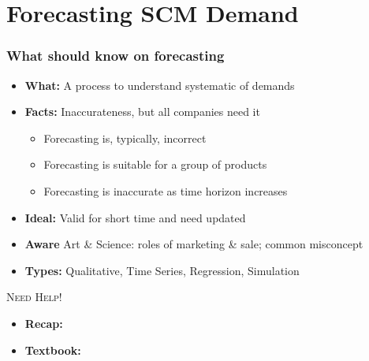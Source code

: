 \documentclass[10pt,handout,notes=show]{beamer}
\begin{document}
\section[Forecasting]{Forecasting SCM Demand}
\begin{frame}
  \frametitle{What should know on forecasting }

  \begin{itemize}
    \item \textbf{What:} A process to understand \alert{systematic of demands}
    \item \textbf{Facts:} Inaccurateness, but all companies need it
    \begin{itemize}
      \item Forecasting is, typically, \alert{incorrect}
      \item Forecasting is suitable for a \alert{group of products}
      \item Forecasting is \alert{inaccurate as time horizon increases} \NextHalfLine
    \end{itemize}
    \item \textbf{Ideal:} Valid for \alert{short time} and \alert{need updated}
    \item \textbf{Aware} Art \& Science: roles of marketing \& sale; common misconcept
    \item \textbf{Types:} Qualitative, Time Series, Regression, Simulation
  \end{itemize}

  \NextLine
  \begin{block}{\small{\textsc{Need Help!}}  }{}
    \begin{itemize}
      \item \textbf{Recap:} \href{https://ie.eng.chula.ac.th/~oran/classes/LSCM/presentation/scm_forecasting.pdf}{}
      \item \textbf{Textbook:} \href{https://otexts.com/fpp3/}{}
    \end{itemize}
  \end{block}



\end{frame}
\end{document}
